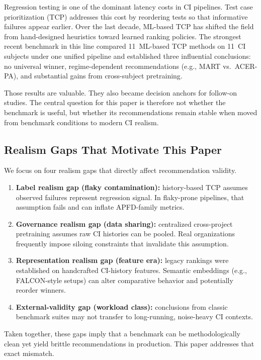 \documentclass[10pt,conference]{IEEEtran}
\begin{document}
Regression testing is one of the dominant latency costs in CI pipelines. Test case prioritization (TCP) addresses this cost by reordering tests so that informative failures appear earlier. Over the last decade, ML-based TCP has shifted the field from hand-designed heuristics toward learned ranking policies. The strongest recent benchmark in this line compared 11~ML-based TCP methods on 11~CI subjects under one unified pipeline and established three influential conclusions: no universal winner, regime-dependent recommendations (e.g., MART vs.\ ACER-PA), and substantial gains from cross-subject pretraining.

Those results are valuable. They also became decision anchors for follow-on studies. The central question for this paper is therefore not whether the benchmark is useful, but whether its recommendations remain stable when moved from benchmark conditions to modern CI realism.

\subsection{Realism Gaps That Motivate This Paper}\label{subsec:gaps}

We focus on four realism gaps that directly affect recommendation validity.

\begin{enumerate}[leftmargin=*]
\item \textbf{Label realism gap (flaky contamination):} history-based TCP assumes observed failures represent regression signal. In flaky-prone pipelines, that assumption fails and can inflate APFD-family metrics.
\item \textbf{Governance realism gap (data sharing):} centralized cross-project pretraining assumes raw CI histories can be pooled. Real organizations frequently impose siloing constraints that invalidate this assumption.
\item \textbf{Representation realism gap (feature era):} legacy rankings were established on handcrafted CI-history features. Semantic embeddings (e.g., FALCON-style setups) can alter comparative behavior and potentially reorder winners.
\item \textbf{External-validity gap (workload class):} conclusions from classic benchmark suites may not transfer to long-running, noise-heavy CI contexts.
\end{enumerate}

Taken together, these gaps imply that a benchmark can be methodologically clean yet yield brittle recommendations in production. This paper addresses that exact mismatch.
\end{document}
